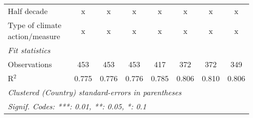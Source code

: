 \begin{tabular}{lccccccc}
   Half decade                                                                            & x            & x            & x            & x             & x             & x             & x\\  
   Type of climate action/measure                                                         & x            & x            & x            & x             & x             & x             & x\\  
   \midrule \emph{Fit statistics}\\
   Observations                                                                           & 453          & 453          & 453          & 417           & 372           & 372           & 349\\  
   R$^2$                                                                                  & 0.775        & 0.776        & 0.776        & 0.785         & 0.806         & 0.810         & 0.806\\  
   \midrule
   \multicolumn{8}{l}{\emph{Clustered (Country) standard-errors in parentheses}}\\
   \multicolumn{8}{l}{\emph{Signif. Codes: ***: 0.01, **: 0.05, *: 0.1}}\\
\end{tabular}
\par\endgroup


